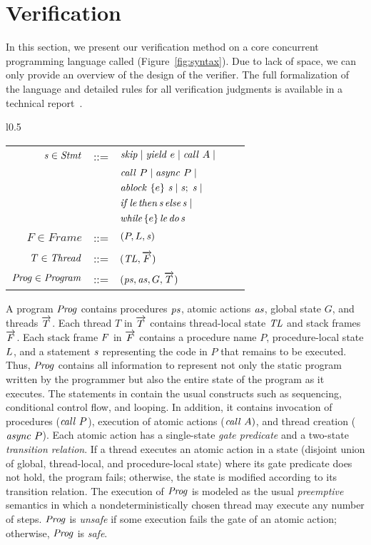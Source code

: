 \section{Verification}
\label{sec:verification}

In this section, we present our verification method on a core concurrent programming language called \civl (Figure~\ref{fig:syntax}).
Due to lack of space, we can only provide an overview of the design of the \civl verifier.
The full formalization of the language and detailed rules for all verification judgments is available in a technical report~\cite{gc-techreport}.

\begin{wrapfigure}[10]{l}{0.5\textwidth}
\setlength{\tabcolsep}{3pt}
\scriptsize{
\begin{tabular}{rclcl}
$\mathit{s} \in \mathit{Stmt}$ &::= & $\mathit{skip} \mid \mathit{yield}\ e \mid \mathit{call}\ A \mid$ \\
                  & & $\mathit{call}\ P \mid \mathit{async}\ P \mid$ \\
                  & & $\mathit{ablock}\ {\{e\}}\ {\mathit{s}} \mid \mathit{s};\;\mathit{s} \mid$\\
                  & & $\mathit{if}\hspace{0.5mm}{\mathit{le}}\hspace{0.5mm}\mathit{then}\hspace{0.5mm}{\mathit{s}}\hspace{0.5mm}\mathit{else}\hspace{0.5mm}{\mathit{s}} \mid$ \\
                  & & $\mathit{while}\hspace{0.5mm}\{e\}\hspace{0.5mm}{\mathit{le}}\hspace{0.5mm}\mathit{do}\hspace{0.5mm}{\mathit{s}}$ \\
$F \in \mathit{Frame} $ &::= & $(P, L, \mathit{s})$ \\
$T \in \mathit{Thread}$ &::= & $(\mathit{TL}, \overrightarrow{F})$ \\
$\mathit{Prog} \in \mathit{Program}$ &::= & $(\mathit{ps}, \mathit{as}, G, \overrightarrow{T})$
\end{tabular}
}
\caption{Syntax}
\label{fig:syntax}
\end{wrapfigure}
A \civl program $\mathit{Prog}$ contains procedures $\mathit{ps}$, atomic actions $\mathit{as}$, 
global state $G$, and threads $\overrightarrow{T}$.
Each thread $T$ in $\overrightarrow{T}$ contains thread-local state $\mathit{TL}$ and stack frames $\overrightarrow{F}$.
Each stack frame $F$ in $\overrightarrow{F}$ contains a procedure name $P$, procedure-local state $L$, and a statement $\mathit{s}$
representing the code in $P$ that remains to be executed.
Thus, $\mathit{Prog}$ contains all information to represent not only the static program 
written by the programmer but also the entire state of the program as it executes.
The statements in \civl contain the usual constructs such as sequencing, conditional control flow, and looping.
In addition, it contains invocation of procedures ($\mathit{call}\ P$), execution of atomic actions ($\mathit{call}\ A)$, and thread creation ($\mathit{async}\ P$).
Each atomic action has a single-state {\em gate predicate\/} and a two-state {\em transition relation\/}.
If a thread executes an atomic action in a state (disjoint union of global, thread-local, and procedure-local state) 
where its gate predicate does not hold, the program fails;
otherwise, the state is modified according to its transition relation.
The execution of $\mathit{Prog}$ is modeled as the usual {\em preemptive\/} semantics in which a
nondeterministically chosen thread may execute any number of steps.
$\mathit{Prog}$ is {\em unsafe\/} if some execution fails the gate of an atomic action;
otherwise, $\mathit{Prog}$ is {\em safe\/}.

